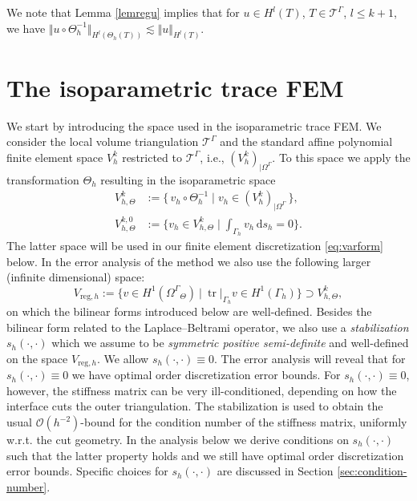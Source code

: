 \documentclass[final]{siamltex}
\begin{document}
We note that Lemma \ref{lemregu} implies that for $u \in H^l(T)$, $T \in {{\mathcal{T}}^{\Gamma}}$, $l \leq k+1$, we have $\Vert u \circ \Theta_h^{-1} \Vert_{H^l(\Theta_h(T))} \lesssim \Vert u \Vert_{H^l(T)}$.
\section{The isoparametric trace FEM} \label{sec:itracefem}
We start by introducing the space used in the isoparametric trace FEM. We consider the local volume triangulation ${{\mathcal T}^{\Gamma}}$ and the standard affine polynomial finite element space $V_h^k$ restricted to ${{\mathcal T}^{\Gamma}}$, i.e., $(V_h^k)_{|{\Omega^{\Gamma}}}$. To this space we apply the transformation $\Theta_h$ resulting in the isoparametric space
\begin{equation} \label{isoFEspace} \begin{split}
 V_{h,\Theta}^k & := \{\, v_h \circ \Theta_h^{-1} \mid v_h \in (V_h^k)_{|{\Omega^{\Gamma}}}\, \},\\
 V_{h,\Theta}^{k,0} & := \{ v_h \in V_{h,\Theta}^k \mid \int_{\Gamma_h} v_h {\,\mathrm{d} {s_h}}=0 \}.
 \end{split}
\end{equation}
The latter space will be used in our finite element discretization \eqref{eq:varform} below. 
In the error analysis of the method we also use the following larger (infinite dimensional) space:
\[
 {V_{\text{reg},h}} := \{ v \in H^1({\Omega^{\Gamma}}_{\Theta})~|~ {\operatorname{tr}}|_{\Gamma_h} v \in H^1(\Gamma_h)\} \supset V_{h,\Theta}^k,
\]
on which the bilinear forms introduced below are well-defined.
Besides the bilinear form related to the Laplace--Beltrami operator, we also use a \emph{stabilization} $s_h(\cdot, \cdot)$ which we assume to be \emph{symmetric positive semi-definite} and well-defined on the space ${V_{\text{reg},h}}$. We allow $s_h(\cdot,\cdot) \equiv 0$. The error analysis will reveal that for $s_h(\cdot,\cdot) \equiv 0$ we have optimal order discretization error bounds. For $s_h(\cdot,\cdot) \equiv 0$, however, the stiffness matrix can be very ill-conditioned, depending on how the interface cuts the outer triangulation. The stabilization is used to obtain the usual $\mathcal{O}(h^{-2})$-bound for the condition number of the stiffness matrix, uniformly w.r.t. the cut geometry. In the analysis below we derive conditions on $s_h(\cdot,\cdot)$ such that the latter property holds and we still have optimal order discretization error bounds. Specific choices for $s_h(\cdot,\cdot)$ are discussed in Section \ref{sec:condition-number}.
\end{document}
